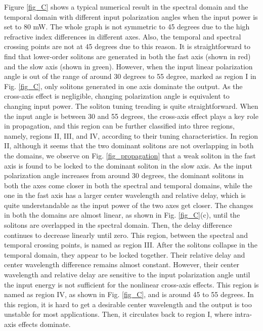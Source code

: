 \documentclass{osa-article}
\begin{document}
Figure \ref{fig_C} shows a typical numerical result in the spectral domain and the temporal domain with different input polarization angles when the input power is set to 80 mW. The whole graph is not symmetric to 45 degrees due to the high refractive index differences in different axes. Also, the temporal and spectral crossing points are not at 45 degrees due to this reason. It is straightforward to find that lower-order solitons are generated in both the fast axis (shown in red) and the slow axis (shown in green). However, when the input linear polarization angle is out of the range of around 30 degrees to 55 degree, marked as region I in Fig. \ref{fig_C}, only solitons generated in one axis dominate the output. As the cross-axis effect is negligible, changing polarization angle is equivalent to changing input power. The soliton tuning treading is quite straightforward. When the input angle is between 30 and 55 degrees, the cross-axis effect plays a key role in propagation, and this region can be further classified into three regions, namely, regions II, III, and IV, according to their tuning characteristics. In region II, although it seems that the two dominant solitons are not overlapping in both the domains, we observe on Fig. \ref{fig_propagation} that a weak soliton in the fast axis is found to be locked to the dominant soliton in the slow axis. As the input polarization angle increases from around 30 degrees, the dominant solitons in both the axes come closer in both the spectral and temporal domains, while the one in the fast axis has a larger center wavelength and relative delay, which is quite understandable as the input power of the two axes get closer. The changes in both the domains are almost linear, as shown in Fig. \ref{fig_C}(c), until the solitons are overlapped in the spectral domain. Then, the delay difference continues to decrease linearly until zero. This region, between the spectral and temporal crossing points, is named as region III. After the solitons collapse in the temporal domain, they appear to be locked together. Their relative delay and center wavelength difference remains almost constant. However, their center wavelength and relative delay are sensitive to the input polarization angle until the input energy is not sufficient for the nonlinear cross-axis effects. This region is named as region IV, as shown in Fig. \ref{fig_C}, and is around 45 to 55 degrees. In this region, it is hard to get a desirable center wavelength and the output is too unstable for most applications. Then, it circulates back to region I, where intra-axis effects dominate.
\end{document}
